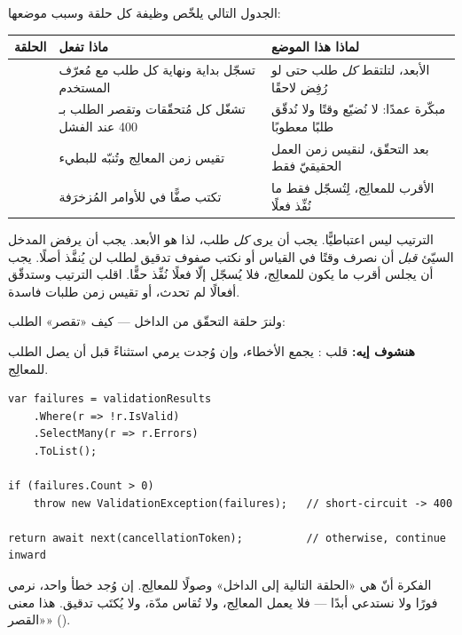 الجدول التالي يلخّص وظيفة كل حلقة وسبب موضعها:

\begin{center}
\begin{tabular}{L{3.2cm} L{4.4cm} L{5cm}}
\toprule
\textbf{\color{spPrimary}الحلقة} & \textbf{\color{spPrimary}ماذا تفعل} & \textbf{\color{spPrimary}لماذا هذا الموضع} \\
\midrule
{} & تسجّل بداية ونهاية كل طلب مع مُعرّف المستخدم & الأبعد، لتلتقط \emph{كل} طلب حتى لو رُفِض لاحقًا \\
 & تشغّل كل مُتحقّقات  وتقصر الطلب بـ 400 عند الفشل & مبكّرة عمدًا: لا نُضيّع وقتًا ولا نُدقّق طلبًا معطوبًا \\
 & تقيس زمن المعالِج وتُنبّه للبطيء & بعد التحقّق، لنقيس زمن العمل الحقيقيّ فقط \\
 & تكتب صفًّا في  للأوامر المُزخرَفة & الأقرب للمعالِج، لِتُسجّل فقط ما نُفِّذ فعلًا \\
\bottomrule
\end{tabular}
\end{center}

\begin{why}
الترتيب ليس اعتباطيًّا.  يجب أن يرى \emph{كل} طلب، لذا هو الأبعد.
 يجب أن يرفض المدخل السيّئ \emph{قبل} أن نصرف وقتًا في القياس أو نكتب صفوف
تدقيق لطلب لن يُنفَّذ أصلًا.  يجب أن يجلس أقرب ما يكون للمعالِج، فلا يُسجّل إلّا
فعلًا نُفِّذ حقًّا. اقلب الترتيب وستدقّق أفعالًا لم تحدث، أو تقيس زمن طلبات فاسدة.
\end{why}

ولنرَ حلقة التحقّق من الداخل — كيف «تقصر» الطلب:

\textbf{هنشوف إيه:} قلب : يجمع الأخطاء، وإن وُجدت يرمي استثناءً
قبل أن يصل الطلب للمعالِج.

\begin{english}
\begin{lstlisting}[language={[Sharp]C}]
var failures = validationResults
    .Where(r => !r.IsValid)
    .SelectMany(r => r.Errors)
    .ToList();

if (failures.Count > 0)
    throw new ValidationException(failures);   // short-circuit -> 400

return await next(cancellationToken);          // otherwise, continue inward
\end{lstlisting}
\end{english}

الفكرة أنّ  هي «الحلقة التالية إلى الداخل» وصولًا للمعالِج. إن وُجد خطأ
واحد، نرمي  فورًا ولا نستدعي  أبدًا — فلا يعمل
المعالِج، ولا تُقاس مدّة، ولا يُكتَب تدقيق. هذا معنى «القصر» ().

